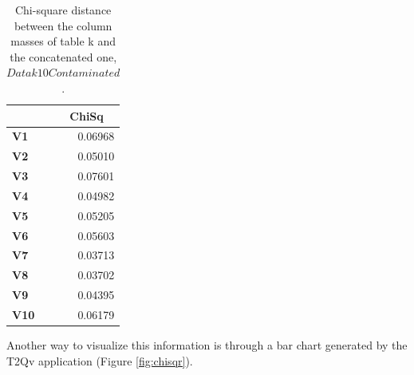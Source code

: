 \documentclass[mathematics,article,submit,moreauthors,pdftex]{mdpi}
\begin{document}
\begin{table}[H]
\centering
\begin{tabular}{lr}
\toprule
\multicolumn{1}{c}{\cellcolor[HTML]{FFFFFF}{\color[HTML]{000000} \textbf{Variables}}} & \multicolumn{1}{c}{\textbf{ChiSq}} \\ \midrule

\textbf{V1}                                                                             & {\color[HTML]{333333} 0.06968}      \\ 
\textbf{V2}                                                                       & {\color[HTML]{333333} 0.05010}      \\ 
\textbf{V3}                                                                       & {\color[HTML]{333333} 0.07601}      \\ 
\textbf{V4}                                                                       & {\color[HTML]{333333} 0.04982}      \\ 
\textbf{V5}                                                                       & {\color[HTML]{333333} 0.05205}      \\ 
\textbf{V6}                                                                       & {\color[HTML]{333333} 0.05603}      \\ 
\textbf{V7}                                                                       & {\color[HTML]{333333} 0.03713}      \\ 
\textbf{V8}                                                                       & {\color[HTML]{333333} 0.03702}      \\ 
\textbf{V9}                                                                       & {\color[HTML]{333333} 0.04395}      \\ 
\textbf{V10}                                                                            & {\color[HTML]{333333} 0.06179}      \\ \hline
\end{tabular}
\caption{Chi-square distance between the column masses of table k and the concatenated one, $Datak10Contaminated$.}

\label{tab:chiexamp}
\end{table}

Another way to visualize this information is through a bar chart
generated by the T2Qv application (Figure \ref{fig:chisqr}).
\end{document}
